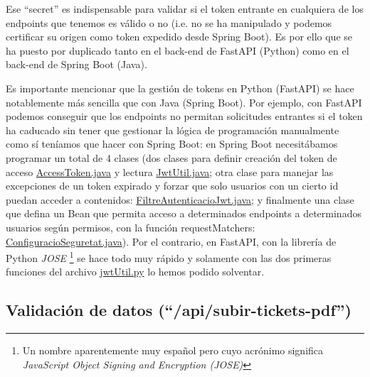 \documentclass[a4paper,12pt]{report}
\begin{document}
	Ese ``secret'' es indispensable para validar si el token entrante en cualquiera de los endpoints que tenemos es válido o no (i.e. no se ha manipulado y podemos certificar su origen como token expedido desde Spring Boot). Es por ello que se ha puesto por duplicado tanto en el back-end de FastAPI (Python) como en el back-end de Spring Boot (Java).
	
	Es importante mencionar que la gestión de tokens en Python (FastAPI) se hace notablemente más sencilla que con Java (Spring Boot). Por ejemplo, con FastAPI podemos conseguir que los endpoints no permitan solicitudes entrantes si el token ha caducado sin tener que gestionar la lógica de programación manualmente como sí teníamos que hacer con Spring Boot: en Spring Boot necesitábamos programar un total de 4 clases (dos clases para definir creación del token de acceso \href{https://github.com/blackcub3s/mercApp/blob/main/APP%20WEB/__springboot__produccio__/app/src/main/java/miApp/app/seguretat/jwt/AccessToken.java}{AccessToken.java} y lectura \href{https://github.com/blackcub3s/mercApp/blob/main/APP%20WEB/__springboot__produccio__/app/src/main/java/miApp/app/seguretat/jwt/JwtUtil.java}{JwtUtil.java}; otra clase para manejar las excepciones de un token expirado y forzar que solo usuarios con un cierto id puedan acceder a contenidos: \href{https://github.com/blackcub3s/mercApp/blob/main/APP%20WEB/__springboot__produccio__/app/src/main/java/miApp/app/seguretat/FiltreAutenticacioJwt.java}{FiltreAutenticacioJwt.java}; y finalmente una clase que defina un Bean que permita acceso a determinados endpoints a determinados usuarios según permisos, con la función requestMatchers: \href{https://github.com/blackcub3s/mercApp/blob/main/APP%20WEB/__springboot__produccio__/app/src/main/java/miApp/app/seguretat/ConfiguracioSeguretat.java}{ConfiguracioSeguretat.java}). Por el contrario, en FastAPI, con la librería de Python \textit{JOSE} \cite{pythonJose}\footnote{Un nombre aparentemente muy español pero cuyo acrónimo significa \textit{JavaScript Object Signing and Encryption (JOSE)}} se hace todo muy rápido y solamente con las dos primeras funciones del archivo \href{https://github.com/blackcub3s/mercApp/blob/main/APP%20WEB/__FastAPI__/app/jwtUtil.py}{jwtUtil.py} lo hemos podido solventar.
	
	\subsection{Validación de datos (``/api/subir-tickets-pdf'')}
	\label{sec:validacioDadesApiSubirtickets}
\end{document}
